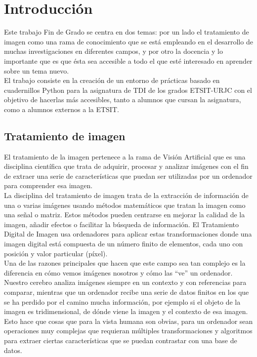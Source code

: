 \chapter{Introducción}

Este trabajo Fin de Grado se centra en dos temas: por un lado el tratamiento de imagen como una rama de conocimiento que se está empleando en el desarrollo de muchas investigaciones en diferentes campos, y por otro la docencia y lo importante que es que ésta sea accesible a todo el que esté interesado en aprender sobre un tema nuevo.\\ 

El trabajo consiste en la creación de un entorno de prácticas basado en cuadernillos Python para la asignatura de TDI de los grados ETSIT-URJC con el objetivo de hacerlas más accesibles, tanto a alumnos que cursan la asignatura, como a alumnos externos a la ETSIT.\\



\section{Tratamiento de imagen}

El tratamiento de la imagen pertenece a la rama de Visión Artificial que es una disciplina científica que trata de adquirir, procesar y analizar imágenes con el fin de extraer una serie de características que puedan ser utilizadas por un ordenador para comprender esa imagen.\\

La disciplina del tratamiento de imagen trata de la extracción de información de una o varias imágenes usando métodos matemáticos que tratan la imagen como una señal o matriz. Estos métodos pueden centrarse en mejorar la calidad de la imagen, añadir efectos o facilitar la búsqueda de información. El Tratamiento Digital de Imagen usa ordenadores para aplicar estas transformaciones donde una imagen digital está compuesta de un número finito de elementos, cada uno con posición y valor particular (píxel)\cite{Historia2}.\\

Una de las razones principales que hacen que este campo sea tan complejo es la diferencia en cómo vemos imágenes nosotros y cómo las ``ve'' un ordenador. Nuestro cerebro analiza imágenes siempre en un contexto y con referencias para comparar, mientras que un ordenador recibe una serie de datos finitos en los que se ha perdido por el camino mucha información, por ejemplo si el objeto de la imagen es tridimensional, de dónde viene la imagen y el contexto de esa imagen. Esto hace que cosas que para la vista humana son obvias, para un ordenador sean operaciones muy complejas que requieran múltiples transformaciones y algoritmos para extraer ciertas características que se puedan contrastar con una base de datos.\\

